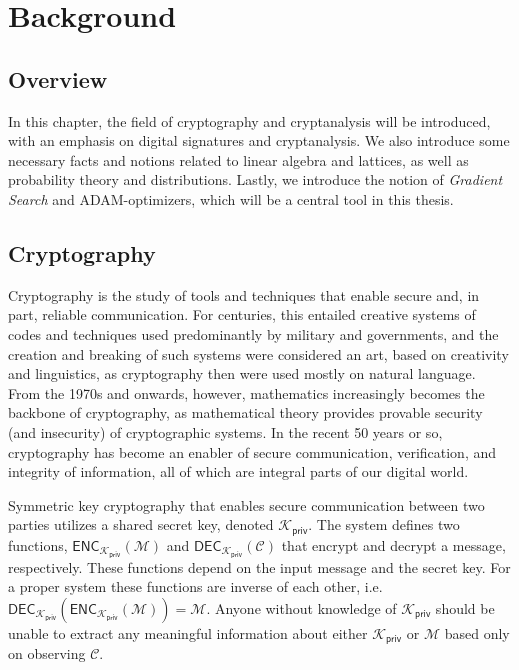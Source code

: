 \newcommand{\privkey}{\mathcal{K}_{\mathsf{priv}}}
\newcommand{\pubkey}{\mathcal{K}_{\mathsf{pub}}}
\newcommand{\enc}[1]{\mathsf{ENC}_{\privkey}(#1)}
\newcommand{\encpub}[1]{\mathsf{ENC}_{\pubkey}(#1)}
\newcommand{\dec}[1]{\mathsf{DEC}_{\privkey}(#1)}

\chapter{Background}
\section{Overview}
In this chapter, the field of cryptography and cryptanalysis will be introduced, with an emphasis on digital signatures and cryptanalysis.  
We also introduce some necessary facts and notions related to linear algebra and lattices, as well as probability theory and distributions.
Lastly, we introduce the notion of \textit{Gradient Search} and ADAM-optimizers, which will be a central tool in this thesis.

\section{Cryptography}
Cryptography is the study of tools and techniques that enable secure and, in part, reliable communication. For centuries, this entailed creative systems of codes and techniques used predominantly by military and governments,
and the creation and breaking of such systems were considered an art, based on creativity and  linguistics, as cryptography then were used mostly on natural language. 
From the 1970s and onwards, however, mathematics increasingly becomes the backbone of cryptography, as mathematical theory provides provable security (and insecurity) of cryptographic systems. 
In the recent 50 years or so, cryptography has become an enabler of secure communication, verification, and integrity of information, all of which are integral parts of our digital world. \cite{KL20}

Symmetric key cryptography that enables secure communication between two parties utilizes a shared secret key, denoted $\privkey$. The system defines two functions,
$\enc{\mathcal{M}}$ and $\dec{\mathcal{C}}$ that encrypt and decrypt a message, respectively. These functions depend on the input message and the secret key. 
For a proper system these functions are inverse of each other, i.e. $\dec{\enc{\mathcal{M}}} = \mathcal{M}$. Anyone without knowledge of $\privkey$ should be unable to
extract any meaningful information about either $\privkey$ or $\mathcal{M}$ based only on observing $\mathcal{C}$.

